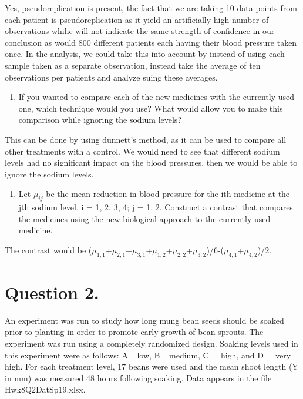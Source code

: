 \documentclass[]{article}
\providecommand{\tightlist}{%
  \setlength{\itemsep}{0pt}\setlength{\parskip}{0pt}}
\begin{document}
Yes, pseudoreplication is present, the fact that we are taking 10 data
points from each patient is pseudoreplication as it yield an
artificially high number of observations whihc will not indicate the
same strength of confidence in our conclusion as would 800 different
patients each having their blood pressure taken once. In the analysis,
we could take this into account by instead of using each sample taken as
a separate observation, instead take the average of ten observations per
patients and analyze suing these averages.

\begin{enumerate}
\def\labelenumi{\Alph{enumi})}
\setcounter{enumi}{6}
\tightlist
\item
  If you wanted to compare each of the new medicines with the currently
  used one, which technique would you use? What would allow you to make
  this comparison while ignoring the sodium levels?
\end{enumerate}

This can be done by using dunnett's method, as it can be used to compare
all other treatments with a control. We would need to see that different
sodium levels had no significant impact on the blood pressures, then we
would be able to ignore the sodium levels.

\begin{enumerate}
\def\labelenumi{\Alph{enumi})}
\setcounter{enumi}{7}
\tightlist
\item
  Let \(\mu_{ij}\) be the mean reduction in blood pressure for the ith
  medicine at the jth sodium level, i = 1, 2, 3, 4; j = 1, 2. Construct
  a contrast that compares the medicines using the new biological
  approach to the currently used medicine.
\end{enumerate}

The contrast would be
(\(\mu_{1,1}\)+\(\mu_{2,1}\)+\(\mu_{3,1}\)+\(\mu_{1,2}\)+\(\mu_{2,2}\)+\(\mu_{3,2}\))/6-(\(\mu_{4,1}\)+\(\mu_{4,2}\))/2.

\pagebreak

\section{Question 2.}\label{question-2.}

An experiment was run to study how long mung bean seeds should be soaked
prior to planting in order to promote early growth of bean sprouts. The
experiment was run using a completely randomized design. Soaking levels
used in this experiment were as follows: A= low, B= medium, C = high,
and D = very high. For each treatment level, 17 beans were used and the
mean shoot length (Y in mm) was measured 48 hours following soaking.
Data appears in the file Hwk8Q2DatSp19.xlsx.
\end{document}
